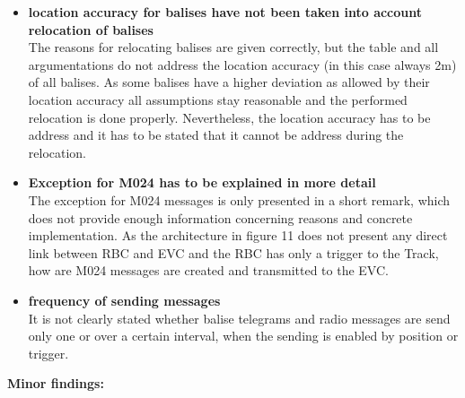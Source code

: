 \documentclass{article}
\begin{document}
\begin{itemize}
\item \textbf{location accuracy for balises have not been taken into account relocation of balises}\\
The reasons for relocating balises are given correctly, but the table and all argumentations do not address the location accuracy (in this case always 2m) of all balises. As some balises have a higher deviation as allowed by their location accuracy all assumptions stay reasonable and the performed relocation is done properly. Nevertheless, the location accuracy has to be address and it has to be stated that it cannot be address during the relocation.
\item \textbf{Exception for M024 has to be explained in more detail}\\
The exception for M024 messages is only presented in a short remark, which does not provide enough information concerning reasons and concrete implementation. As the architecture in figure 11 does not present any direct link between RBC and EVC and the RBC has only a trigger to the Track, how are M024 messages are created and transmitted to the EVC.
\item \textbf{frequency of sending messages}\\
It is not clearly stated whether balise telegrams and radio messages are send only one or over a certain interval, when the sending is enabled by position or trigger.
\end{itemize}

\textbf{Minor findings:}
\end{document}
